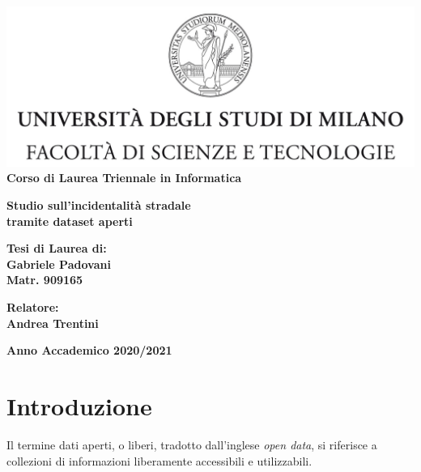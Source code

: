\documentclass[a4paper,12pt]{report}
\newcommand{\quotestyle}[1]{\textit{#1}}
\begin{document}
\begin{titlepage}
\begin{center}
\includegraphics[width=\textwidth]{Logo.jpg}\\
{\large{\bf Corso di Laurea Triennale in Informatica}}
\end{center}
\vspace{12mm}
\begin{center}
{\huge{\bf Studio sull'incidentalità stradale}}\\
\vspace{4mm}
{\huge{\bf tramite dataset aperti}}\\
\end{center}
\vspace{12mm}
\begin{flushright}
{\large{\bf Tesi di Laurea di:}}\\
{\large{\bf Gabriele Padovani}}\\
{\large{\bf Matr. 909165}}\\
\end{flushright}
\vspace{4mm}
\begin{flushleft}
{\large{\bf Relatore:}}\\
{\large{\bf Andrea Trentini}}\\
\end{flushleft}
\vspace{12mm}
\begin{center}
{\large{\bf Anno Accademico 2020/2021}}
\end{center}
\end{titlepage}

\tableofcontents

\listoftodos

\chapter{Introduzione}
Il termine dati aperti, o liberi, tradotto dall'inglese \quotestyle{open data}, 
si riferisce a collezioni di informazioni liberamente accessibili e 
utilizzabili. 
\end{document}
